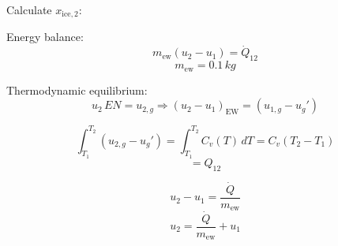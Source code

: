 Calculate \( x_{\text{ice},2} \):

Energy balance:
\[
m_{\text{ew}} (u_2 - u_1) = \dot{Q}_{12}
\]
\[
m_{\text{ew}} = 0.1 \, kg
\]

Thermodynamic equilibrium:
\[
u_2 \, EN = u_{2,g} \Rightarrow (u_2 - u_1)_{\text{EW}} = (u_{1,g} - u_{g}')
\]

\[
\int_{T_1}^{T_2} (u_{2,g} - u_{g}') = \int_{T_1}^{T_2} C_v(T) \, dT = C_v (T_2 - T_1)
\]
\[
= Q_{12}
\]

\[
u_2 - u_1 = \frac{\dot{Q}}{m_{\text{ew}}}
\]
\[
u_2 = \frac{\dot{Q}}{m_{\text{ew}}} + u_1
\]